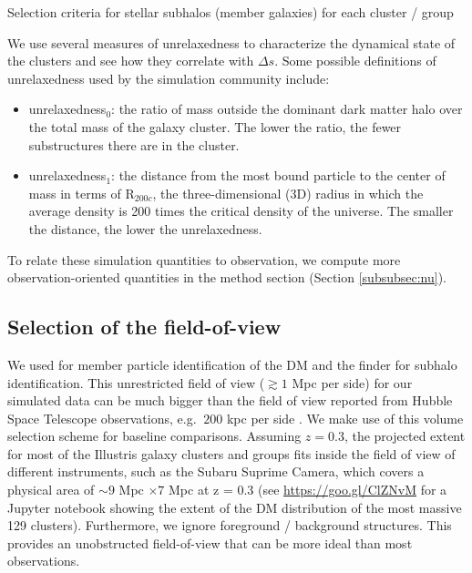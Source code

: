 \begin{table*}
\begin{center}
	\caption{ Selection criteria for stellar subhalos (member galaxies) for each
		cluster / group 
\label{tab:member_galaxy_selections}} 
  
\end{center} 
\end{table*}
We use several measures of unrelaxedness to characterize 
the dynamical state of the clusters and see how they correlate with $\Delta s$.
Some possible definitions of unrelaxedness used by the simulation community
include:
\begin{itemize}
	\item unrelaxedness$_0$: the ratio of mass outside the dominant dark matter halo over the total mass
		of the galaxy cluster. The lower the ratio, the fewer substructures there
		are in the cluster. 
	\item unrelaxedness$_1$: the distance from the most bound particle to
		the center of mass in terms of R$_{200c}$, the three-dimensional (3D) radius in which the
		average density is 200 times the critical density of the universe. 
		The smaller the distance, the lower the unrelaxedness. 
\end{itemize}
To relate these simulation quantities to observation, 
we compute more observation-oriented 
quantities in the method section (Section \ref{subsubsec:nu}). 

\subsection{Selection of the field-of-view}
\label{sec:FOV}


We used {} for member particle identification of the DM and the 
{} finder for subhalo identification.
This unrestricted field of view ($\gtrsim 1$ Mpc per side) for our simulated data can be much bigger than
the field of view reported from Hubble Space Telescope 
observations, e.g. $~200$ kpc per side \citep{Zitrin2012a}. We make use of this volume selection scheme
for baseline comparisons. Assuming $z = 0.3$, 
the projected extent for most of the Illustris galaxy clusters and groups
fits inside the field of view of different instruments, such as the Subaru Suprime Camera,
which covers a physical area of $\sim 9$ Mpc $\times 7$ Mpc at z = 0.3 
(see \href{https://goo.gl/ClZNvM}{https://goo.gl/ClZNvM} for a Jupyter notebook 
showing the extent of the DM distribution of the most massive 129
clusters). Furthermore, we ignore foreground / background structures.
This provides an unobstructed field-of-view that can be more ideal than most observations. 

